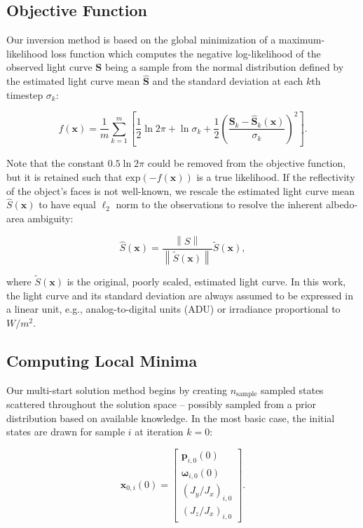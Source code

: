 \documentclass[a4paper,twocolumn]{spaceDebrisC} %
\newcommand{\vctr}[1]{\bm{#1}}
\newcommand{\norm}[1]{\left\lVert#1\right\rVert}
\begin{document}
\subsection{Objective Function}

Our inversion method is based on the global minimization of a maximum-likelihood loss function which computes the negative log-likelihood of the observed light curve $\vctr{S}$ being a sample from the normal distribution defined by the estimated light curve mean $\hat{\vctr{S}}$ and the standard deviation at each $k$th timestep $\sigma_k$:

\begin{equation} \label{eq:nll_loss}
 f(\vctr{x}) = \frac{1}{m}\sum_{k=1}^{m}\left[\frac{1}{2} \ln2\pi + \ln\sigma_k + \frac{1}{2}\left(\frac{\vctr{S}_k - \hat{\vctr{S}}_k(\vctr{x})}{\sigma_k}\right)^2 \right].
 \end{equation}

Note that the constant $0.5\ln2\pi$ could be removed from the objective function, but it is retained such that $\text{exp}\left(-f(\vctr{x})\right)$ is a true likelihood. If the reflectivity of the object's faces is not well-known, we rescale the estimated light curve mean $\hat{S}(\vctr{x})$ to have equal $\ell_2$ norm to the observations to resolve the inherent albedo-area ambiguity:

\begin{equation}
 \hat{S}(\vctr{x}) = \frac{\norm{S}}{\norm{\tilde{S}(\vctr{x})}} \tilde{S}(\vctr{x}),
\end{equation}

\noindent
where $\tilde{S}(\vctr{x})$ is the original, poorly scaled, estimated light curve. In this work, the light curve and its standard deviation are always assumed to be expressed in a linear unit, e.g., analog-to-digital units (ADU) or irradiance proportional to $W/m^2$.

\subsection{Computing Local Minima} \label{sec:run_solver}

Our multi-start solution method begins by creating $n_\text{sample}$ sampled states scattered throughout the solution space -- possibly sampled from a prior distribution based on available knowledge. In the most basic case, the initial states are drawn for sample $i$ at iteration $k=0$:

\begin{equation}
 \vctr{x}_{0,i}(0) = \begin{bmatrix}\vctr{p}_{i,0}(0) \\ \vctr{\omega}_{i,0}(0) \\ \left(J_y / J_x\right)_{i,0} \\ \left(J_z / J_x\right)_{i,0}\end{bmatrix}.
\end{equation}
\end{document}
